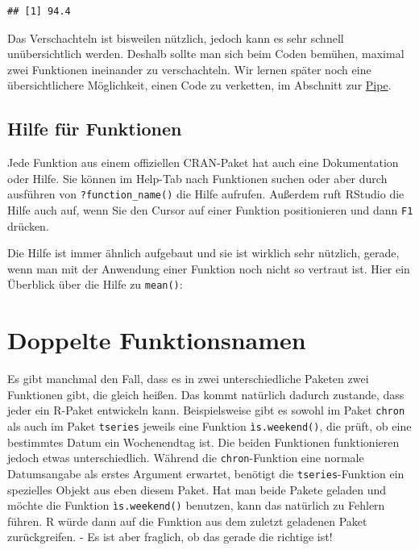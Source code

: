 \documentclass[
]{book}
\begin{document}
\begin{verbatim}
## [1] 94.4
\end{verbatim}

Das Verschachteln ist bisweilen nützlich, jedoch kann es sehr schnell unübersichtlich werden. Deshalb sollte man sich beim Coden bemühen, maximal zwei Funktionen ineinander zu verschachteln. Wir lernen später noch eine übersichtlichere Möglichkeit, einen Code zu verketten, im Abschnitt zur \protect\hyperlink{pipe}{Pipe}.

\hypertarget{hilfe-fuxfcr-funktionen}{%
\subsection{Hilfe für Funktionen}\label{hilfe-fuxfcr-funktionen}}

Jede Funktion aus einem offiziellen CRAN-Paket hat auch eine Dokumentation oder Hilfe. Sie können im Help-Tab nach Funktionen suchen oder aber durch ausführen von \texttt{?function\_name()} die Hilfe aufrufen. Außerdem ruft RStudio die Hilfe auch auf, wenn Sie den Cursor auf einer Funktion positionieren und dann \texttt{F1} drücken.

Die Hilfe ist immer ähnlich aufgebaut und sie ist wirklich sehr nützlich, gerade, wenn man mit der Anwendung einer Funktion noch nicht so vertraut ist. Hier ein Überblick über die Hilfe zu \texttt{mean()}:

\hypertarget{doppelte-funktionsnamen}{%
\section{Doppelte Funktionsnamen}\label{doppelte-funktionsnamen}}

Es gibt manchmal den Fall, dass es in zwei unterschiedliche Paketen zwei Funktionen gibt, die gleich heißen. Das kommt natürlich dadurch zustande, dass jeder ein R-Paket entwickeln kann. Beispielsweise gibt es sowohl im Paket \texttt{chron} als auch im Paket \texttt{tseries} jeweils eine Funktion \texttt{ìs.weekend()}, die prüft, ob eine bestimmtes Datum ein Wochenendtag ist. Die beiden Funktionen funktionieren jedoch etwas unterschiedlich. Während die \texttt{chron}-Funktion eine normale Datumsangabe als erstes Argument erwartet, benötigt die \texttt{tseries}-Funktion ein spezielles Objekt aus eben diesem Paket. Hat man beide Pakete geladen und möchte die Funktion \texttt{ìs.weekend()} benutzen, kann das natürlich zu Fehlern führen. R würde dann auf die Funktion aus dem zuletzt geladenen Paket zurückgreifen. - Es ist aber fraglich, ob das gerade die richtige ist!
\end{document}
